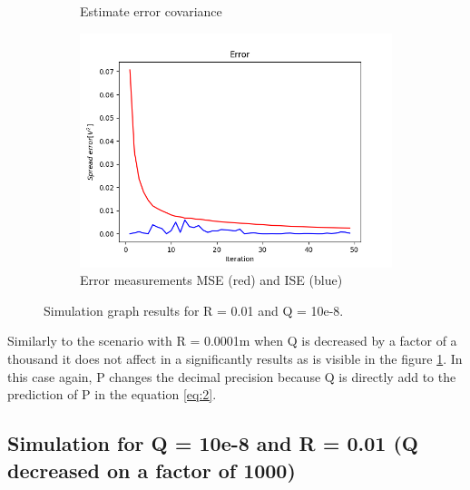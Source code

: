 \documentclass{article}
\begin{document}
\begin{figure}[H]
\begin{subfigure} {.5\textwidth}
            \caption{Estimate error covariance}
        \end{subfigure}
        \begin{subfigure}{.5\textwidth}            
            \centering
            \includegraphics[width=0.6\linewidth]{./img/r01q-8_E.png}
            \caption{Error measurements MSE (red) and ISE (blue)}
        \end{subfigure}
        \caption{Simulation graph results for R = 0.01 and Q = 10e-8.}
        \label{fig:simulation4}
    \end{figure}   

    Similarly to the scenario with R = 0.0001m when Q is decreased by a factor of a thousand it does not 
    affect in a significantly results as is visible in the figure \ref{fig:simulation4}. In this case
    again, P changes the decimal precision because Q is directly add to the prediction of P in the equation 
    \ref{eq:2}.
    
    \subsection{Simulation for Q = 10e-8 and R = 0.01 (Q decreased on a factor of 1000)}
\end{document}
